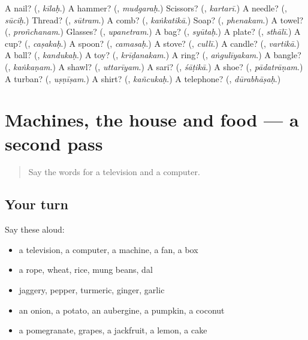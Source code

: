 \begin{tcolorbox}[breakable,colback=teal!4,colframe=teal!35!black,title={Before you move on}]
A nail? (\textbf{}, \emph{kīlaḥ}.) A hammer? (\textbf{}, \emph{mudgaraḥ}.) Scissors? (\textbf{}, \emph{kartarī}.) A needle? (\textbf{}, \emph{sūciḥ}.) Thread? (\textbf{}, \emph{sūtram}.) A comb? (\textbf{}, \emph{kaṅkatikā}.) Soap? (\textbf{}, \emph{phenakam}.) A towel? (\textbf{}, \emph{proñchanam}.) Glasses? (\textbf{}, \emph{upanetram}.) A bag? (\textbf{}, \emph{syūtaḥ}.) A plate? (\textbf{}, \emph{sthālī}.) A cup? (\textbf{}, \emph{caṣakaḥ}.) A spoon? (\textbf{}, \emph{camasaḥ}.) A stove? (\textbf{}, \emph{cullī}.) A candle? (\textbf{}, \emph{vartikā}.) A ball? (\textbf{}, \emph{kandukaḥ}.) A toy? (\textbf{}, \emph{krīḍanakam}.) A ring? (\textbf{}, \emph{aṅgulīyakam}.) A bangle? (\textbf{}, \emph{kaṅkaṇam}.) A shawl? (\textbf{}, \emph{uttarīyam}.) A sari? (\textbf{}, \emph{śāṭikā}.) A shoe? (\textbf{}, \emph{pādatrāṇam}.) A turban? (\textbf{}, \emph{uṣṇīṣam}.) A shirt? (\textbf{}, \emph{kañcukaḥ}.) A telephone? (\textbf{}, \emph{dūrabhāṣaḥ}.)
\end{tcolorbox}
\section[(dialogue)]{Machines, the house and food — a second pass}

\label{lesson:SA-R109-second-pass-machines-the-house-and-food}



\begin{quote}
Say the words for a television and a computer.
\end{quote}

\subsection*{Your turn}
Say these aloud:

\begin{itemize}
\raggedright
  \item a television, a computer, a machine, a fan, a box
  \item a rope, wheat, rice, mung beans, dal
  \item jaggery, pepper, turmeric, ginger, garlic
  \item an onion, a potato, an aubergine, a pumpkin, a coconut
  \item a pomegranate, grapes, a jackfruit, a lemon, a cake
\end{itemize}

